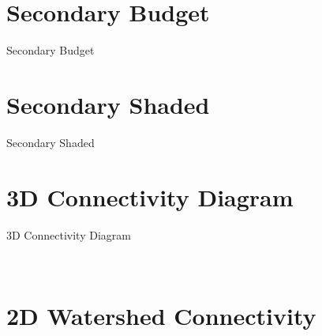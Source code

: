 \documentclass[bigger]{beamer}
\begin{document}
\section{Secondary Budget}
  \begin{frame}{Secondary Budget}
    \begin{center}
      \secondarywireframe[1]
    \end{center}
  \end{frame}

\section{Secondary Shaded}
  \begin{frame}{Secondary Shaded}
    \begin{center}
    \end{center}
  \end{frame}

\section{3D Connectivity Diagram}
\begin{frame}{3D Connectivity Diagram}
    \begin{center}
       \\
    \end{center}
  \end{frame}


\section{2D Watershed Connectivity}
\begin{frame}
\begin{columns}[t]
\begin{column}{0.7\textwidth}
\begin{figure}\flushleft
      \watershedconnectivity[0.73]
\end{figure}
\end{column}
\begin{column}{0.3\textwidth}
\end{column}
\end{columns}
\end{frame}
\end{document}
